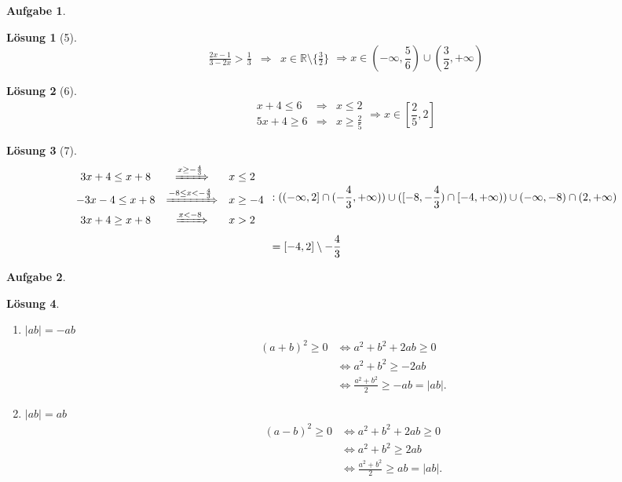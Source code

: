 \documentclass{article}
\theoremstyle{definition}
\newtheorem{ub}{Aufgabe}
\newtheorem*{lo*}{Lösung}
\begin{document}
\begin{ub}
\begin{lo*}[5]
\[\begin{array}{ccl}
			\frac{2x-1}{3-2x} > \frac{1}{3} & \Rightarrow & x \in \mathbb{R} \setminus \{\frac{3}{2}\}
		\end{array} \Rightarrow x \in (-\infty , \frac{5}{6}) \cup (\frac{3}{2} , +\infty)
		 \]
	\end{lo*}
	\begin{lo*}[6]
		\[ 
		\begin{array}{ccl}
			x+4 \leq 6 & \Rightarrow & x \leq 2 \\
			5x+4 \geq 6 & \Rightarrow & x \geq \frac{2}{5}
		\end{array} \Rightarrow x \in [\frac{2}{5},2]
		 \]
	\end{lo*}
	\begin{lo*}[7]
		\begin{align*}
			\begin{array}{ccl}
				3x+4 \leq x+8 & \xRightarrow{x \geq -\frac{4}{3}} & x \leq 2 \\
				-3x-4 \leq x+8 & \xRightarrow[]{-8 \leq x < -\frac{4}{3}} & x \geq -4 \\
				3x+4 \geq x+8 & \xRightarrow[]{x < -8} & x > 2
			\end{array} & : ((-\infty , 2] \cap (-\frac{4}{3},+\infty)) \cup 
		([-8,-\frac{4}{3}) \cap [-4,+\infty)) \cup (-\infty , -8) \cap (2,+\infty) \\
		& = [-4,2]\setminus {-\frac{4}{3}}
		\end{align*}
	\end{lo*}
\end{ub}
\begin{ub}
	\begin{lo*}
		\begin{enumerate}
			\item 
			\( |ab| = -ab \)
			\begin{align*}
				(a+b)^2 \geq 0 & \iff a^2 + b^2 + 2ab \geq 0 \\
				& \iff a^2 + b^2 \geq -2ab \\
				& \iff \frac{a^2 + b^2}{2} \geq -ab = |ab|. 
			\end{align*}
			\item $ |ab| = ab $
			\begin{align*}
				(a-b)^2 \geq 0 & \iff a^2 + b^2 + 2ab \geq 0 \\
				& \iff a^2 + b^2 \geq 2ab \\
				& \iff \frac{a^2 + b^2}{2} \geq ab = |ab|. 
			\end{align*} 
		\end{enumerate}
	\end{lo*}
\end{ub}
\end{document}
